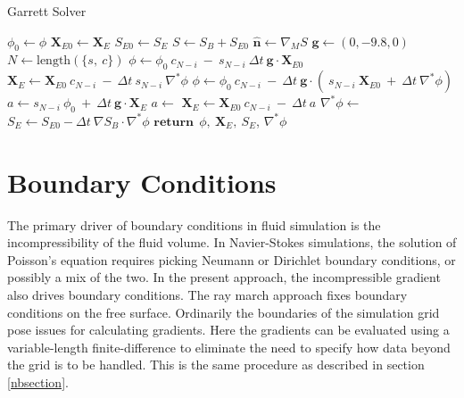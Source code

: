 \documentclass{article}
\def\gvec{\textbf{g}}
\def\Xvec{\textbf{X}}
\def\nhat{\hat{\textbf{n}}}
\def\dt{\Delta t}
\def\inabla{\nabla^{*}}
\begin{document}
\begin{algorithm}
\caption{Garrett Solver}\label{garrettalgo}
\begin{algorithmic}
\Procedure{GarretSolver}{$\phi$, $\Xvec_E$, $S_E$, $\inabla\phi$, $\dt$, $M$, $T$, $\{s,\ c\}$} 
\State $\phi_0 \gets \phi$
\State $\Xvec_{E0} \gets \Xvec_E$
\State $S_{E0} \gets S_E$
\State $S \gets S_B + S_{E0}$  
\State $\nhat \gets \nabla_M S$ 
\State $\gvec \gets (0,-9.8,0)$ 
\State $N \gets \textrm{length}(\{ s,\ c   \})$ 
\State $\phi \gets \phi_0\ c_{N-i}\  -\  s_{N-i}\ \dt\ \gvec\cdot \Xvec_{E0}$
\State $\Xvec_E  \gets \Xvec_{E0}\ c_{N-i}\  -\  \dt\ s_{N-i}\ \inabla\phi$
\Else
\State $\phi \gets \phi_0\ c_{N-i}\ -\ \dt\ \gvec\cdot \left( \ s_{N-i}\ \Xvec_{E0}  \ +\ \dt\ \inabla\phi \right)$
\State $a \gets s_{N-i}\ \phi_0\ +\ \dt\ \gvec\cdot\Xvec_E$ 
\State $a \gets $  
\State $\Xvec_E \gets \Xvec_{E0}\ c_{N-i}\ -\ \dt\ a $
\EndIf
\State $\inabla\phi \gets $ 
\EndFor
\State $S_E  \gets S_{E0} - \dt\ \nabla S_B \cdot \inabla\phi $
\State $\textbf{return} \ \ \phi,\  \Xvec_E,\ S_E$, $\inabla\phi$
\EndProcedure
\end{algorithmic}
\end{algorithm}






\section{Boundary Conditions}\label{boundaryconditions}

The primary driver of boundary conditions in fluid simulation is the incompressibility of the fluid volume.  In Navier-Stokes simulations, the solution of Poisson's equation requires picking Neumann or Dirichlet boundary conditions, or possibly a mix of the two.  In the present approach, the incompressible gradient also drives boundary conditions.  The ray march approach fixes boundary conditions on the free surface. Ordinarily the boundaries of the simulation grid pose issues for calculating gradients. Here the gradients can be evaluated using a variable-length finite-difference to eliminate the need to specify how data beyond the grid is to be handled.  This is the same procedure as described in section \ref{nbsection}.
\end{document}
